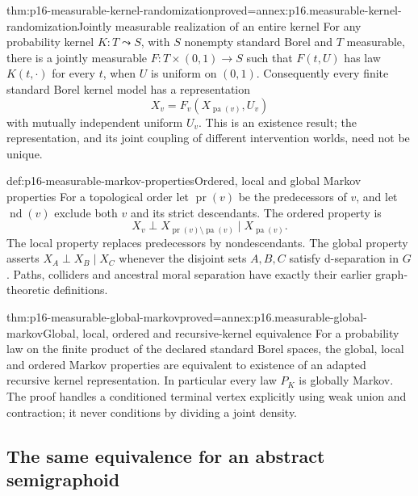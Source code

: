 \begin{hbtheorem}{thm:p16-measurable-kernel-randomization}{proved=annex:p16.measurable-kernel-randomization}{Jointly measurable realization of an entire kernel}
For any probability kernel \(K:T\leadsto S\), with \(S\) nonempty
standard Borel and \(T\) measurable, there is a jointly measurable
\(F:T\times(0,1)\to S\) such that \(F(t,U)\) has law \(K(t,\cdot)\)
for every \(t\), when \(U\) is uniform on \((0,1)\).
Consequently every finite standard Borel kernel model has a representation
\[
 X_v=F_v(X_{\operatorname{pa}(v)},U_v)
\]
with mutually independent uniform \(U_v\). This is an existence result;
the representation, and its joint coupling of different intervention
worlds, need not be unique.
\end{hbtheorem}

\begin{hbdefinition}{def:p16-measurable-markov-properties}{Ordered, local and global Markov properties}
For a topological order let \(\operatorname{pr}(v)\) be the predecessors
of \(v\), and let \(\operatorname{nd}(v)\) exclude both \(v\) and its
strict descendants. The ordered property is
\[
 X_v\perp X_{\operatorname{pr}(v)\setminus\operatorname{pa}(v)}
               \mid X_{\operatorname{pa}(v)}.
\]
The local property replaces predecessors by nondescendants. The global
property asserts \(X_A\perp X_B\mid X_C\) whenever the disjoint sets
\(A,B,C\) satisfy d-separation in \(G\). Paths, colliders and ancestral
moral separation have exactly their earlier graph-theoretic definitions.
\end{hbdefinition}

\begin{hbtheorem}{thm:p16-measurable-global-markov}{proved=annex:p16.measurable-global-markov}{Global, local, ordered and recursive-kernel equivalence}
For a probability law on the finite product of the declared standard
Borel spaces, the global, local and ordered Markov properties are
equivalent to existence of an adapted recursive kernel representation.
In particular every law \(P_K\) is globally Markov. The proof handles
a conditioned terminal vertex explicitly using weak union and contraction;
it never conditions by dividing a joint density.
\end{hbtheorem}

\subsection{The same equivalence for an abstract semigraphoid}

